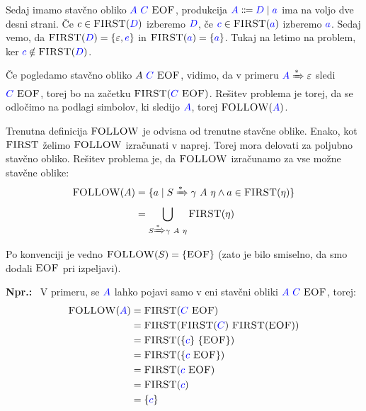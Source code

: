 \documentclass{article}
\newcommand{\Ex}{\textbf{Npr.:}\ }
\newcommand{\FIRST}{\textsc{FIRST}}
\newcommand{\FOLLOW}{\textsc{FOLLOW}}
\newcommand{\EOF}{\textsc{EOF}}
\newcommand{\Symbol}[1]{\textcolor{blue}{#1}}
\newcommand{\Null}{\varepsilon}
\newcommand{\Arrow}{\Coloneqq}
\newcommand{\DeriveStar}{\xRightarrow{\ast}}
\newcommand{\Seq}{\ }
\newcommand{\Union}{\mathrel{|}}
\begin{document}
Sedaj imamo stavčno obliko $\Symbol{A} \Seq \Symbol{C} \Seq \EOF$, produkcija $\Symbol{A} \Arrow \Symbol{D} \Union \Symbol{a}$ ima na voljo dve desni strani.
Če $c \in \FIRST(\Symbol{D})$ izberemo $\Symbol{D}$, če $\Symbol{c} \in \FIRST(\Symbol{a})$ izberemo $\Symbol{a}$.
Sedaj vemo, da $\FIRST(\Symbol{D}) = \{\Null, \Symbol{e}\}$ in $\FIRST(\Symbol{a}) = \{\Symbol{a}\}$.
Tukaj na letimo na problem, ker $\Symbol{c} \notin \FIRST(\Symbol{D})$.

Če pogledamo stavčno obliko $A \Seq \Symbol{C} \Seq \EOF$, vidimo, da v primeru $\Symbol{A} \DeriveStar \varepsilon$ sledi $\Symbol{C} \Seq \EOF$, torej bo na začetku $\FIRST(\Symbol{C} \Seq \EOF)$.
Rešitev problema je torej, da se odločimo na podlagi simbolov, ki sledijo $\Symbol{A}$, torej $\FOLLOW(\Symbol{A})$.

Trenutna definicija $\FOLLOW$ je odvisna od trenutne stavčne oblike.
Enako, kot $\FIRST$ želimo $\FOLLOW$ izračunati v naprej.
Torej mora delovati za poljubno stavčno obliko.
Rešitev problema je, da $\FOLLOW$ izračunamo za vse možne stavčne oblike:
\begin{align*}
  \FOLLOW(A) &= \{a \mid S \DeriveStar \gamma \Seq A \Seq \eta \land a \in \FIRST(\eta)\}\\
  &= \bigcup_{S \DeriveStar \gamma \Seq A \Seq \eta} \FIRST(\eta)
\end{align*}
Po konvenciji je vedno $\FOLLOW(S) = \{\EOF\}$ (zato je bilo smiselno, da smo dodali $\EOF$ pri izpeljavi).

\Ex
V primeru, se $\Symbol{A}$ lahko pojavi samo v eni stavčni obliki $\Symbol{A} \Seq \Symbol{C} \Seq \EOF$, torej:
\begin{align*}
  \FOLLOW(\Symbol{A}) &= \FIRST(\Symbol{C} \Seq \EOF) \\
             &= \FIRST(\FIRST(\Symbol{C}) \Seq \FIRST(\EOF))\\
             &= \FIRST(\{\Symbol{c}\} \Seq \{\EOF\})\\
             &= \FIRST(\{\Symbol{c} \Seq \EOF\})\\
             &= \FIRST(\Symbol{c} \Seq \EOF) \\
             &= \FIRST(\Symbol{c})\\
             &= \{\Symbol{c}\}
\end{align*}
\end{document}
